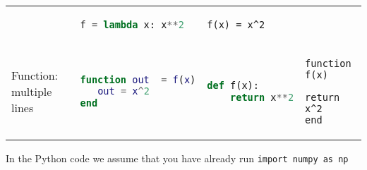 \documentclass[10pt, landscape]{article}
\begin{document}
\begin{multicols}{2}
\begin{tabular}[]{@{}llll@{}}
\begin{minipage}[t]{0.22\columnwidth}
\end{minipage} & \begin{minipage}[t]{0.22\columnwidth}\raggedright
\begin{lstlisting}[language=Python]
f = lambda x: x**2
\end{lstlisting}

\end{minipage} & \begin{minipage}[t]{0.25\columnwidth}\raggedright
\begin{lstlisting}
f(x) = x^2
\end{lstlisting}

\end{minipage}\tabularnewline
\begin{minipage}[t]{0.19\columnwidth}\raggedright
Function: multiple lines
\end{minipage} & \begin{minipage}[t]{0.22\columnwidth}\raggedright
\begin{lstlisting}[language=Matlab]
function out  = f(x)
   out = x^2
end
\end{lstlisting}

\end{minipage} & \begin{minipage}[t]{0.22\columnwidth}\raggedright
\begin{lstlisting}[language=Python]
def f(x):
    return x**2
\end{lstlisting}

\end{minipage} & \begin{minipage}[t]{0.25\columnwidth}\raggedright
\begin{lstlisting}
function f(x)
   return x^2
end
\end{lstlisting}

\end{minipage}\tabularnewline
\bottomrule
\end{tabular}

In the Python code we assume that you have already run
\lstinline!import numpy as np!

\end{multicols}
\end{document}
